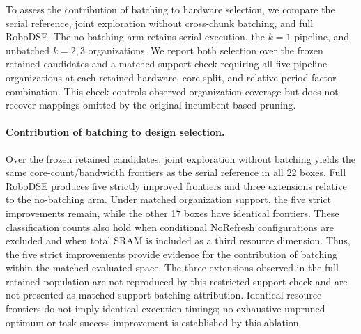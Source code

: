 To assess the contribution of batching to hardware selection, we compare the
serial reference, joint exploration without cross-chunk batching, and full
RoboDSE. The no-batching arm retains serial execution, the $k=1$ pipeline,
and unbatched $k=2,3$ organizations. We report both selection over the frozen
retained candidates and a matched-support check requiring all five pipeline
organizations at each retained hardware, core-split, and relative-period-factor
combination. This check controls observed organization coverage but does not
recover mappings omitted by the original incumbent-based pruning.

\paragraph{Contribution of batching to design selection.}
Over the frozen retained candidates, joint exploration without batching yields
the same core-count/bandwidth frontiers as the serial reference in all 22 boxes.
Full RoboDSE produces five strictly improved frontiers and three extensions
relative to the no-batching arm. Under matched organization support, the five
strict improvements remain, while the other 17 boxes have identical frontiers.
These classification counts also hold when conditional NoRefresh configurations
are excluded and when total SRAM is included as a third resource dimension.
Thus, the five strict improvements provide evidence for the contribution of
batching within the matched evaluated space. The three extensions observed in
the full retained population are not reproduced by this restricted-support
check and are not presented as matched-support batching attribution. Identical
resource frontiers do not imply identical execution timings; no exhaustive
unpruned optimum or task-success improvement is established by this ablation.
